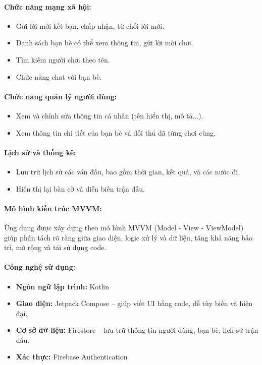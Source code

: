 \documentclass[a4paper,12pt]{article}
\begin{document}
\paragraph{\textbf{Chức năng mạng xã hội:}} %
\begin{itemize}[label=·]
    \item Gửi lời mời kết bạn, chấp nhận, từ chối lời mời.
    \item Danh sách bạn bè có thể xem thông tin, gửi lời mời chơi.
    \item Tìm kiếm người chơi theo tên.
    \item Chức năng chat với bạn bè.
\end{itemize}

\paragraph{\textbf{Chức năng quản lý người dùng:}} %
\begin{itemize}[label=·]
    \item Xem và chỉnh sửa thông tin cá nhân (tên hiển thị, mô tả...).
    \item Xem thông tin chi tiết của bạn bè và đối thủ đã từng chơi cùng.
\end{itemize}

\paragraph{\textbf{Lịch sử và thống kê:}} %
\begin{itemize}[label=·]
    \item Lưu trữ lịch sử các ván đấu, bao gồm thời gian, kết quả, và các nước đi.
    \item Hiển thị lại bàn cờ và diễn biến trận đấu.
\end{itemize}

\paragraph{\textbf{Mô hình kiến trúc MVVM:}} %
\noindent Ứng dụng được xây dựng theo mô hình MVVM (Model - View - ViewModel) giúp phân tách rõ ràng giữa giao diện, logic xử lý và dữ liệu, tăng khả năng bảo trì, mở rộng và tái sử dụng code.

\paragraph{\textbf{Công nghệ sử dụng:}} %
\begin{itemize}[label=·]
    \item \textbf{Ngôn ngữ lập trình:} Kotlin
    \item \textbf{Giao diện:} Jetpack Compose – giúp viết UI bằng code, dễ tùy biến và hiện đại.
    \item \textbf{Cơ sở dữ liệu:} Firestore – lưu trữ thông tin người dùng, bạn bè, lịch sử trận đấu.
    \item \textbf{Xác thực:} Firebase Authentication
\end{itemize}
\end{document}
